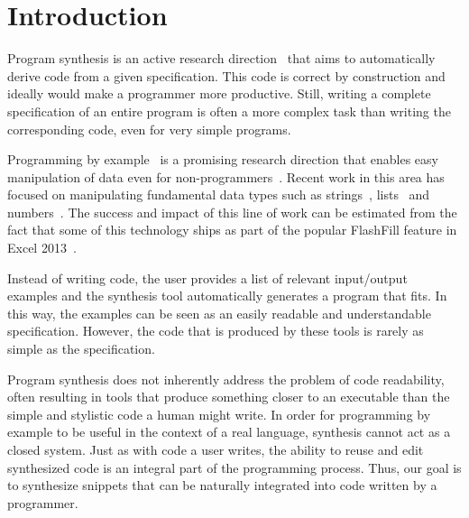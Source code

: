 \section{Introduction}
\label{intro}

Program synthesis is an active research direction~\cite{DBLP:journals/toplas/MannaW80, DBLP:journals/cacm/GulwaniHS12,DBLP:conf/icfp/Bodik15, DBLP:conf/pldi/KuncakMPS10, DBLP:conf/aplas/Solar-Lezama09, DBLP:conf/pldi/SrivastavaGCF11} that aims to automatically derive code from a given specification.
This code is correct by construction and ideally would make a programmer more productive.
Still, writing a complete specification of an entire program is often a more complex task than writing the corresponding code, even for very simple programs.

Programming by example~\cite{cypher93,lieberman01,synasc12} is a promising research direction that enables easy manipulation of data even for non-programmers~\cite{GulwaniHS12}.
Recent work in this area has focused on manipulating fundamental data types such as strings~\cite{flashFillPOPL,vldb12,icml13}, lists~\cite{FeserCD15,Osera:2015} and numbers~\cite{cav12}.
The success and impact of this line of work can be estimated from the fact that some of this technology ships as part of the popular FlashFill feature in Excel 2013~\cite{flashFillPOPL}.

Instead of writing code, the user provides a list of relevant input/output examples and the synthesis tool automatically generates a program that fits.
In this way, the examples can be seen as an easily readable and understandable specification.
However, the code that is produced by these tools is rarely as simple as the specification.

Program synthesis does not inherently address the problem of code readability, often resulting in tools that produce something closer to an executable than the simple and stylistic code a human might write.
In order for programming by example to be useful in the context of a real language, synthesis cannot act as a closed system.
Just as with code a user writes, the ability to reuse and edit synthesized code is an integral part of the programming process.
Thus, our goal is to synthesize snippets that can be naturally integrated into code written by a programmer.

